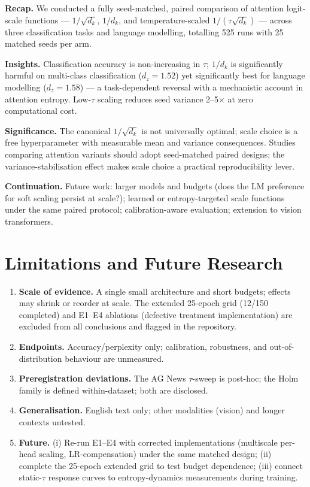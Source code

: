 \documentclass[11pt,a4paper]{article}
\begin{document}
\textbf{Recap.} We conducted a fully seed-matched, paired comparison of attention logit-scale functions --- $1/\sqrt{d_k}$, $1/d_k$, and temperature-scaled $1/(\tau\sqrt{d_k})$ --- across three classification tasks and language modelling, totalling 525 runs with 25 matched seeds per arm.

\textbf{Insights.} Classification accuracy is non-increasing in $\tau$; $1/d_k$ is significantly harmful on multi-class classification ($d_z{=}1.52$) yet significantly best for language modelling ($d_z{=}1.58$) --- a task-dependent reversal with a mechanistic account in attention entropy. Low-$\tau$ scaling reduces seed variance 2--5$\times$ at zero computational cost.

\textbf{Significance.} The canonical $1/\sqrt{d_k}$ is not universally optimal; scale choice is a free hyperparameter with measurable mean and variance consequences. Studies comparing attention variants should adopt seed-matched paired designs; the variance-stabilisation effect makes scale choice a practical reproducibility lever.

\textbf{Continuation.} Future work: larger models and budgets (does the LM preference for soft scaling persist at scale?); learned or entropy-targeted scale functions under the same paired protocol; calibration-aware evaluation; extension to vision transformers.

\section{Limitations and Future Research}

\begin{enumerate}[leftmargin=*,itemsep=2pt]
\item \textbf{Scale of evidence.} A single small architecture and short budgets; effects may shrink or reorder at scale. The extended 25-epoch grid (12/150 completed) and E1--E4 ablations (defective treatment implementation) are excluded from all conclusions and flagged in the repository.
\item \textbf{Endpoints.} Accuracy/perplexity only; calibration, robustness, and out-of-distribution behaviour are unmeasured.
\item \textbf{Preregistration deviations.} The AG News $\tau$-sweep is post-hoc; the Holm family is defined within-dataset; both are disclosed.
\item \textbf{Generalisation.} English text only; other modalities (vision) and longer contexts untested.
\item \textbf{Future.} (i) Re-run E1--E4 with corrected implementations (multiscale per-head scaling, LR-compensation) under the same matched design; (ii) complete the 25-epoch extended grid to test budget dependence; (iii) connect static-$\tau$ response curves to entropy-dynamics measurements during training.
\end{enumerate}
\end{document}
